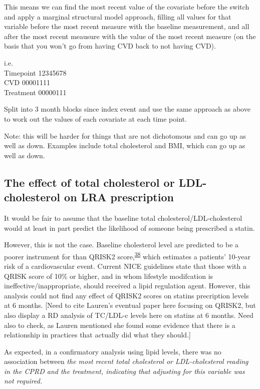 \documentclass[a4paper, twoside]{templates/ociamthesis}
\begin{document}
This means we can find the most recent value of the covariate before the switch and apply a marginal structural model approach, filling all values for that variable before the most recent measure with the baseline measurement, and all after the most recent meausure with the value of the most recent measure (on the basis that you won't go from having CVD back to not having CVD).

i.e.\\
Timepoint 12345678\\
CVD 00001111\\
Treatment 00000111

Split into 3 month blocks since index event and use the same approach as above to work out the values of each covariate at each time point.

Note: this will be harder for things that are not dichotomous and can go up as well as down. Examples include total cholesterol and BMI, which can go up as well as down.

\hypertarget{the-effect-of-total-cholesterol-or-ldl-cholesterol-on-lra-prescription}{%
\subsection{The effect of total cholesterol or LDL-cholesterol on LRA prescription}\label{the-effect-of-total-cholesterol-or-ldl-cholesterol-on-lra-prescription}}

It would be fair to assume that the baseline total cholesterol/LDL-cholesterol would at least in part predict the likelihood of someone being prescribed a statin.

However, this is not the case. Baseline cholesterol level are predicted to be a poorer instrument for than QRISK2 score,\textsuperscript{\protect\hyperlink{ref-hippisley-cox2008}{38}} which estimates a patients' 10-year risk of a cardiovascular event. Current NICE guidelines state that those with a QRISK score of 10\% or higher, and in whom lifestyle modifcation is ineffective/inappropriate, should received a lipid regulation agent. However, this analysis could not find any effect of QRISK2 scores on statins precription levels at 6 months. {[}Need to cite Lauren's eventual paper here focusing on QRISK2, but also display a RD analysis of TC/LDL-c levels here on statins at 6 months. Need also to check, as Lauren mentioned she found some evidence that there is a relationship in practices that actually did what they should.{]}

As expected, in a confirmatory analysis using lipid levels, there was no association between \emph{the most recent total cholesterol or LDL-cholesterol reading in the CPRD and the treatment, indicating that adjusting for this variable was not required.}
\end{document}
